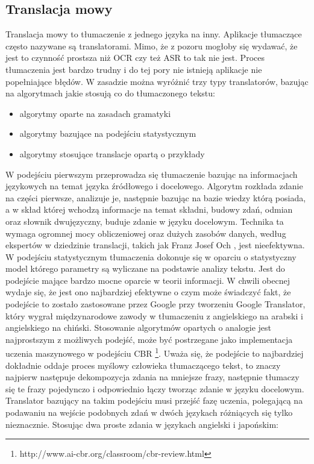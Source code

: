 \subsection{Translacja mowy}
Translacja mowy to tłumaczenie z jednego języka na inny. Aplikacje tłumaczące często nazywane są translatorami. Mimo, że z pozoru mogłoby się wydawać, że jest to czynność prostsza niż OCR czy też ASR to tak nie jest. Proces tłumaczenia jest bardzo trudny i do tej pory nie istnieją aplikacje nie popełniające błędów. W zasadzie można wyróżnić trzy typy translatorów, bazując na algorytmach jakie stosują co do tłumaczonego tekstu:
\begin{itemize}
	\item algorytmy oparte na zasadach gramatyki
	\item algorytmy bazujące na podejściu statystycznym
	\item algorytmy stosujące translacje opartą o przykłady
\end{itemize}
W podejściu pierwszym przeprowadza się tłumaczenie bazując na informacjach językowych na temat języka źródłowego i docelowego. Algorytm rozkłada zdanie na części pierwsze, analizuje je, następnie bazując na bazie wiedzy którą posiada, a w skład której wchodzą informacje na temat składni, budowy zdań, odmian oraz słownik dwujęzyczny, buduje zdanie w języku docelowym. Technika ta wymaga ogromnej mocy obliczeniowej oraz dużych zasobów danych, według ekspertów w dziedzinie translacji, takich jak Franz Josef Och \cite{och2003}, jest nieefektywna.
W podejściu statystycznym tłumaczenia dokonuje się w oparciu o statystyczny model którego parametry są wyliczane na podstawie analizy tekstu. Jest do podejście mające bardzo mocne oparcie w teorii informacji. W chwili obecnej wydaje się, że jest ono najbardziej efektywne o czym może świadczyć fakt, że podejście to zostało zastosowane przez Google przy tworzeniu Google Translator, który wygrał międzynarodowe zawody w tłumaczeniu z angielskiego na arabski i angielskiego na chiński.
Stosowanie algorytmów opartych o analogie jest najprostszym z możliwych podejść, może być postrzegane jako implementacja uczenia maszynowego w podejściu CBR \footnote{http://www.ai-cbr.org/classroom/cbr-review.html}. Uważa się, że podejście to najbardziej dokładnie oddaje proces myślowy człowieka tłumaczącego tekst, to znaczy najpierw następuje dekompozycja zdania na mniejsze frazy, następnie tłumaczy się te frazy pojedynczo i odpowiednio łączy tworząc zdanie w języku docelowym. Translator bazujący na takim podejściu musi przejść fazę uczenia, polegającą na podawaniu na wejście podobnych zdań w dwóch językach różniących się tylko nieznacznie. Stosując dwa proste zdania w językach angielski i japońskim: 
